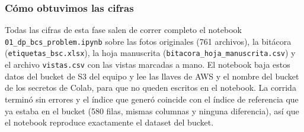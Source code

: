 \subsubsection*{Cómo obtuvimos las cifras}

Todas las cifras de esta fase salen de correr completo el notebook \nolinkurl{01_dp_bcs_problem.ipynb} sobre las fotos originales (761 archivos), la bitácora (\nolinkurl{etiquetas_bsc.xlsx}), la hoja manuscrita (\nolinkurl{bitacora_hoja_manuscrita.csv}) y el archivo \nolinkurl{vistas.csv} con las vistas marcadas a mano. El notebook baja estos datos del bucket de S3 del equipo y lee las llaves de AWS y el nombre del bucket de los secretos de Colab, para que no queden escritos en el notebook. La corrida terminó sin errores y el índice que generó coincide con el índice de referencia que ya estaba en el bucket (580 filas, mismas columnas y ninguna diferencia), así que el notebook reproduce exactamente el dataset del bucket.

